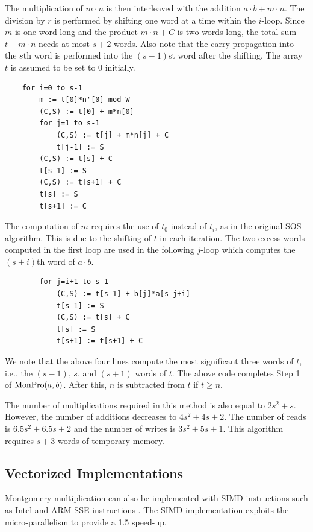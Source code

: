 \documentclass[twocolumn]{svjour3}          %
\begin{document}
\noindent
The multiplication of $m\cdot n$ is then interleaved with
the addition $a \cdot b + m \cdot n$. The division by $r$ is performed
by shifting one word at a time within the $i$-loop.
Since $m$ is one word long and the product $m\cdot n+C$ is two words long,
the total sum $t + m\cdot n$ needs at most $s+2$ words.
Also note that the carry propagation into the $s$th word is performed into
the $(s-1)$st word after the shifting. The array $t$ is assumed
to be set to 0 initially.
%
\begin{verbatim}
    for i=0 to s-1
        m := t[0]*n'[0] mod W
        (C,S) := t[0] + m*n[0]
        for j=1 to s-1
            (C,S) := t[j] + m*n[j] + C
            t[j-1] := S
        (C,S) := t[s] + C
        t[s-1] := S
        (C,S) := t[s+1] + C
        t[s] := S
        t[s+1] := C
\end{verbatim}
%
The computation of $m$ requires the use of $t_0$ instead
of $t_i$, as in the original SOS algorithm.
This is due to the shifting of $t$ in each iteration.
The two excess words computed in the first loop are used in the
following $j$-loop which computes the $(s+i)$th word of
$a\cdot b$.
%
\begin{verbatim}
        for j=i+1 to s-1
            (C,S) := t[s-1] + b[j]*a[s-j+i]
            t[s-1] := S
            (C,S) := t[s] + C
            t[s] := S
            t[s+1] := t[s+1] + C
\end{verbatim}
%
We note that the above four lines compute the most significant three words of
$t$, i.e., the $(s-1)$, $s$, and $(s+1)$ words of $t$. The
above code completes Step 1 of $\mbox{MonPro}(a,b)$. After this, $n$ is
subtracted from $t$ if $t\geq n$.

The number of multiplications required in this method is also equal to
$2s^2+s$. However, the number of additions decreases to $4s^2+4s+2$.
The number of reads is $6.5s^2+6.5s+2$ and the number of
writes is $3s^2+5s+1$.
This algorithm requires $s+3$ words of temporary memory.

\subsection{Vectorized Implementations}
\label{vectorized}

Montgomery multiplication can also be implemented with SIMD instructions
such as Intel and ARM SSE instructions \cite{GK12:Software,BMZS13:Montgomery}.
The SIMD implementation exploits the micro-parallelism to provide a 1.5 speed-up.
\end{document}
